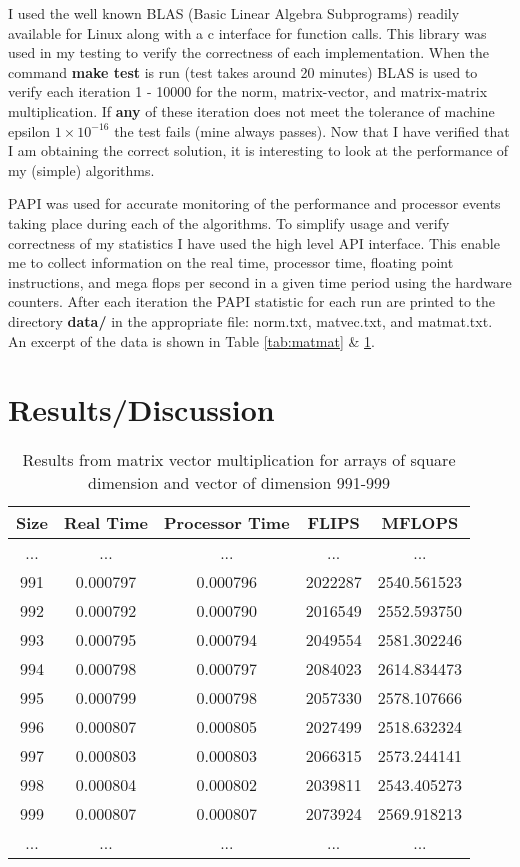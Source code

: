 \documentclass[a4paper,12pt]{article}
\begin{document}
I used the well known BLAS (Basic Linear Algebra Subprograms) readily available for Linux along with a c interface for function calls. This library was used in my testing to verify the correctness of each implementation. When the command \textbf{make test} is run (test takes around 20 minutes) BLAS is used to verify each iteration 1 - 10000 for the norm, matrix-vector, and matrix-matrix multiplication. If \textbf{any} of these iteration does not meet the tolerance of machine epsilon $1 \times 10^{-16}$ the test fails (mine always passes). Now that I have verified that I am obtaining the correct solution, it is interesting to look at the performance of my (simple) algorithms. 

PAPI was used for accurate monitoring of the performance and processor events taking place during each of the algorithms. To simplify usage and verify correctness of my statistics I have used the high level API interface. This enable me to collect information on the real time, processor time, floating point instructions, and mega flops per second in a given time period using the hardware counters. After each iteration the PAPI statistic for each run are printed to the directory \textbf{data/} in the appropriate file: norm.txt, matvec.txt, and matmat.txt. An excerpt of the data is shown in Table \ref{tab:matmat} \& \ref{tab:matvec}.

\section{Results/Discussion}

\begin{table}[!ht]
  \centering
  \caption{Results from matrix vector multiplication for arrays of square dimension and vector of dimension 991-999}
  \label{tab:matvec}

  \vspace{3mm}
  \begin{tabular}{ c c c c c }
    Size & Real Time & Processor Time & FLIPS & MFLOPS \\ \hline
    ... & ... & ... & ... & ... \\
    991 & 0.000797 & 0.000796 & 2022287 & 2540.561523 \\
    992 & 0.000792 & 0.000790 & 2016549 & 2552.593750 \\
    993 & 0.000795 & 0.000794 & 2049554 & 2581.302246 \\
    994 & 0.000798 & 0.000797 & 2084023 & 2614.834473 \\
    995 & 0.000799 & 0.000798 & 2057330 & 2578.107666 \\
    996 & 0.000807 & 0.000805 & 2027499 & 2518.632324 \\
    997 & 0.000803 & 0.000803 & 2066315 & 2573.244141 \\
    998 & 0.000804 & 0.000802 & 2039811 & 2543.405273 \\
    999 & 0.000807 & 0.000807 & 2073924 & 2569.918213 \\
    ... & ... & ... & ... & ... 
  \end{tabular}
\end{table}
\end{document}
